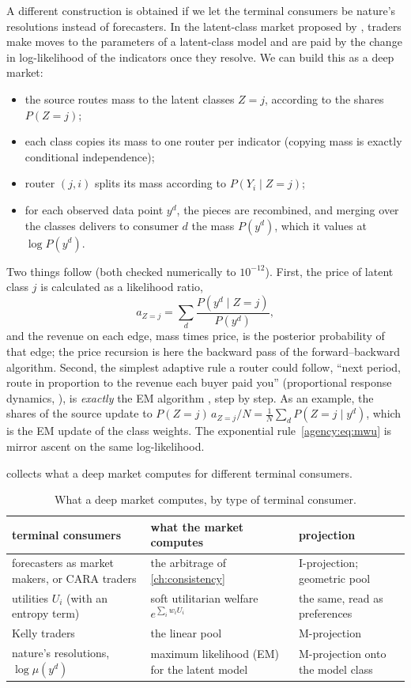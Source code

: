 \begin{draftblock}
A different construction is obtained if we let the terminal consumers be nature's resolutions instead of forecasters. In the latent-class market proposed by \citet{tailcalledLatentVariablesPrediction2023}, traders make moves to the parameters of a latent-class model and are paid by the change in log-likelihood of the indicators once they resolve. We can build this as a deep market:
\begin{itemize}
\item the source routes mass to the latent classes $Z=j$, according to the shares $P(Z=j)$;
\item each class copies its mass to one router per indicator (copying mass is exactly conditional independence);
\item router $(j,i)$ splits its mass according to $P(Y_i\mid Z=j)$;
\item for each observed data point $y^d$, the pieces are recombined, and merging over the classes delivers to consumer $d$ the mass $P(y^d)$, which it values at $\log P(y^d)$.
\end{itemize}

Two things follow (both checked numerically to $10^{-12}$). First, the price of latent class $j$ is calculated as a likelihood ratio,
\[
a_{Z=j}=\sum_d\frac{P(y^d\mid Z=j)}{P(y^d)},
\]
and the revenue on each edge, mass times price, is the posterior probability of that edge; the price recursion is here the backward pass of the forward--backward algorithm. Second, the simplest adaptive rule a router could follow, ``next period, route in proportion to the revenue each buyer paid you'' (proportional response dynamics, \citealt{birnbaum2011}), is \emph{exactly} the EM algorithm \citep{dempsterMaximumLikelihoodIncomplete1977}, step by step. As an example, the shares of the source update to $P(Z=j)\,a_{Z=j}/N=\frac1N\sum_dP(Z=j\mid y^d)$, which is the EM update of the class weights. The exponential rule~\eqref{agency:eq:mwu} is mirror ascent on the same log-likelihood.

 collects what a deep market computes for different terminal consumers.

\begin{table}[ht]
\centering\small
\begin{tabular}{@{}p{}p{}p{}@{}}
\toprule
terminal consumers & what the market computes & projection \\
\midrule
forecasters as market makers, or CARA traders & the arbitrage of \cref{ch:consistency} & I-projection; geometric pool \\
utilities $U_i$ (with an entropy term) & soft utilitarian welfare $e^{\sum_iw_iU_i}$ & the same, read as preferences \\
Kelly traders & the linear pool & M-projection \\
nature's resolutions, $\log\mu(y^d)$ & maximum likelihood (EM) for the latent model & M-projection onto the model class \\
\bottomrule
\end{tabular}
\caption{What a deep market computes, by type of terminal consumer.}\label{arb:tab:terminal}
\end{table}


\end{draftblock}
